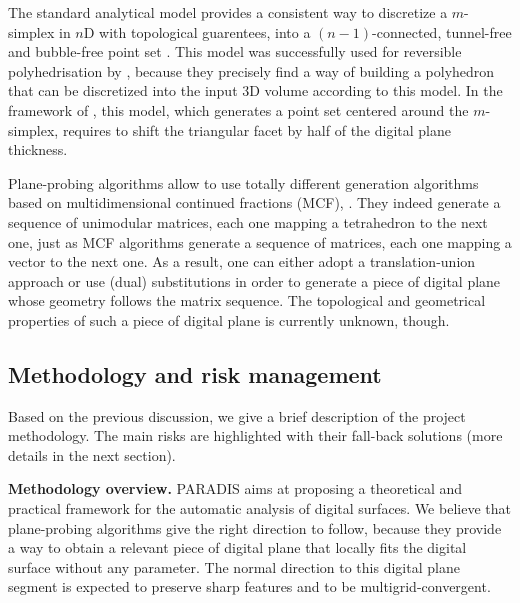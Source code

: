 The standard analytical model provides a consistent way to discretize a $m$-simplex
in $n$D with topological guarentees, \ie into a $(n-1)$-connected, tunnel-free
and bubble-free point set \cite{Andres2003}. This model was successfully
used for reversible polyhedrisation by \citeauthor*{Sivignon2004} \cite{Sivignon2004},
because they precisely find a way of building a polyhedron that can be
discretized into the input 3D volume according to this model.
In the framework of \cite{LPRJMIV2017}, this model, which generates a point set
centered around the $m$-simplex, requires to shift the triangular facet by half of the
digital plane thickness.

Plane-probing algorithms allow to use totally different generation algorithms
based on multidimensional continued fractions (MCF), \eg \cite{Fernique2009,Jamet2016}. 
They indeed generate a sequence of unimodular matrices, each one mapping a tetrahedron to
the next one, just as MCF algorithms generate a sequence of matrices, each one mapping
a vector to the next one. As a result, one can either adopt a translation-union approach \cite{Jamet2016}
or use (dual) substitutions \cite{Fernique2009} in order to generate a piece
of digital plane whose geometry follows the matrix sequence. The topological and geometrical
properties of such a piece of digital plane is currently unknown, though.  



\subsection{Methodology and risk management}
\label{sec:methodo}


Based on the previous discussion, we give a brief description of the project methodology.
The main risks are highlighted with their fall-back solutions (more details in the next section).  

\noindent\textbf{Methodology overview.}
PARADIS aims at proposing a theoretical and practical framework for the automatic
analysis of digital surfaces. We believe that plane-probing algorithms give the right
direction to follow, because they provide a way to obtain a relevant piece of digital
plane that locally fits the digital surface without any parameter. The normal direction
to this digital plane segment is expected to preserve sharp features and to be multigrid-convergent.

